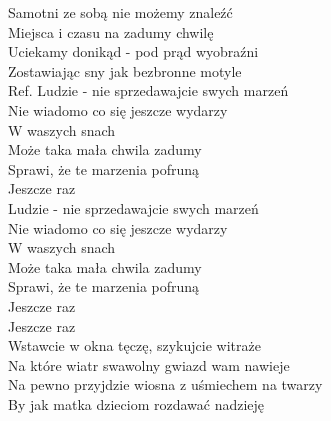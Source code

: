 
\begin{flushleft}
Samotni ze sobą nie możemy znaleźć \\
Miejsca i czasu na zadumy chwilę \\
Uciekamy donikąd - pod prąd wyobraźni \\
Zostawiając sny jak bezbronne motyle  \\
\vskip 3mm
Ref. Ludzie - nie sprzedawajcie swych marzeń \\
\hspace{0.9cm}Nie wiadomo co się jeszcze wydarzy \\
\hspace{0.9cm}W waszych snach \tab{} \\
\hspace{0.9cm}Może taka mała chwila zadumy \\
\hspace{0.9cm}Sprawi, że te marzenia pofruną \\
\hspace{0.9cm}Jeszcze raz \tab{}\\
\vskip 3mm
\hspace{0.9cm}Ludzie - nie sprzedawajcie swych marzeń \\
\hspace{0.9cm}Nie wiadomo co się jeszcze wydarzy \\
\hspace{0.9cm}W waszych snach \tab{}\\
\hspace{0.9cm}Może taka mała chwila zadumy \\
\hspace{0.9cm}Sprawi, że te marzenia pofruną \\
\hspace{0.9cm}Jeszcze raz \tab{}\\
\hspace{0.9cm}Jeszcze raz \tab{}\\
\vskip 3mm
Wstawcie w okna tęczę, szykujcie witraże \\
Na które wiatr swawolny gwiazd wam nawieje \\
Na pewno przyjdzie wiosna z uśmiechem na twarzy \\
By jak matka dzieciom rozdawać nadzieję  \\

\end{flushleft}
